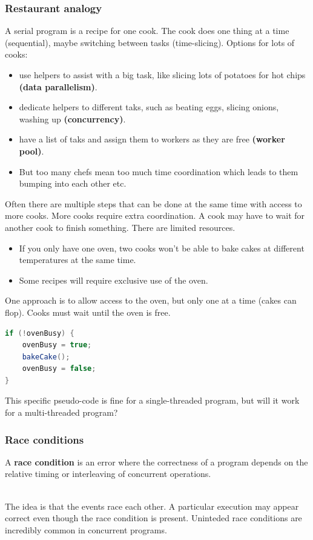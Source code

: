 \documentclass[11pt]{article}
\begin{document}
\subsubsection{Restaurant analogy}
A serial program is a recipe for one cook. The cook does one thing at a time (sequential), maybe switching between tasks (time-slicing).
Options for lots of cooks:
\begin{itemize}
    \item use helpers to assist with a big task, like slicing lots of potatoes for hot chips \textbf{(data parallelism)}.
    \item dedicate helpers to different taks, such as beating eggs, slicing onions, washing up \textbf{(concurrency)}.
    \item have a list of taks and assign them to workers as they are free \textbf{(worker pool)}.
    \item But too many chefs mean too much time coordination which leads to them bumping into each other etc.
\end{itemize}
Often there are multiple steps that can be done at the same time with access to more cooks. More cooks require extra coordination.
A cook may have to wait for another cook to finish something. There are limited resources.
\begin{itemize}
    \item If you only have one oven, two cooks won't be able to bake cakes at different temperatures at the same time.
    \item Some recipes will require exclusive use of the oven.
\end{itemize}
One approach is to allow access to the oven, but only one at a time (cakes can flop). Cooks must wait until the oven is free.
\begin{lstlisting}[language=Java]
if (!ovenBusy) {
    ovenBusy = true;
    bakeCake();
    ovenBusy = false;
}
\end{lstlisting}
\begin{warning}
This specific pseudo-code is fine for a single-threaded program, but will it work for a multi-threaded program?
\end{warning}
\subsubsection{Race conditions}
\begin{definition}
A \textbf{race condition} is an error where the correctness of a program depends on the relative timing or interleaving of concurrent operations.
\end{definition}
$\quad$\\[-1em]
The idea is that the events race each other. A particular execution may appear correct even though the race condition is present.
Uninteded race conditions are incredibly common in concurrent programs.
\end{document}
